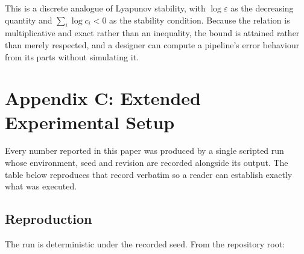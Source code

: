 \documentclass[10pt,journal,compsoc,twocolumn]{IEEEtran}
\begin{document}
This is a discrete analogue of Lyapunov stability, with $\log \varepsilon$ as the decreasing quantity and $\sum_i \log c_i < 0$ as the stability condition. Because the relation is multiplicative and exact rather than an inequality, the bound is attained rather than merely respected, and a designer can compute a pipeline's error behaviour from its parts without simulating it.




\section{Appendix C: Extended Experimental Setup}


Every number reported in this paper was produced by a single scripted run whose environment, seed and revision are recorded alongside its output. The table below reproduces that record verbatim so a reader can establish exactly what was executed.
\begin{table}[htbp]
\centering
{}
\end{table}


\subsection{Reproduction}


The run is deterministic under the recorded seed. From the repository root:
\end{document}
